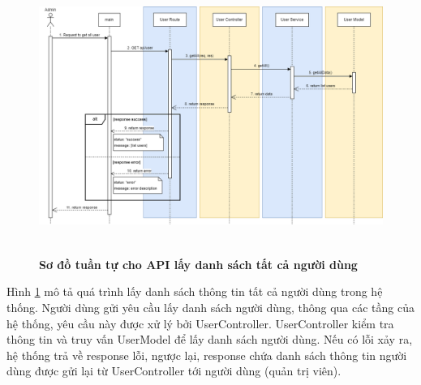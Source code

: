 \begin{figure}[H]
  \centering
  \includegraphics[width=16cm,height=9cm]{Images/sequence_api/getAllUsers.png}
  \caption[Sơ đồ tuần tự cho API lấy danh sách tất cả người dùng ]{\bfseries \fontsize{12pt}{0pt}
  \selectfont Sơ đồ tuần tự cho API lấy danh sách tất cả người dùng }
  \label{api_getAllUser} %
\end{figure}
Hình \ref{api_getAllUser} mô tả quá trình lấy danh sách thông tin tất cả người dùng trong hệ thống. Người dùng gửi yêu cầu lấy danh sách người dùng, thông qua các tầng của hệ thống, yêu cầu này được xử lý bởi UserController. UserController kiểm tra thông tin và truy vấn UserModel để lấy danh sách người dùng. 
Nếu có lỗi xảy ra, hệ thống trả về response lỗi, ngược lại, response chứa danh sách thông tin người dùng được gửi lại từ UserController tới người dùng (quản trị viên).

